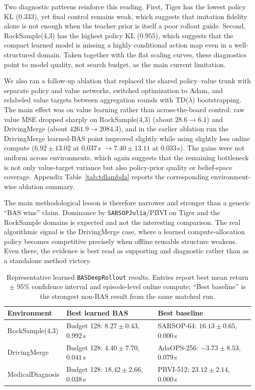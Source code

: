 \documentclass[10pt,twocolumn]{article}
\begin{document}
Two diagnostic patterns reinforce this reading. First, Tiger has the lowest policy KL ($0.333$), yet final control remains weak, which suggests that imitation fidelity alone is not enough when the teacher prior is itself a poor rollout guide. Second, RockSample(4,3) has the highest policy KL ($0.955$), which suggests that the compact learned model is missing a highly conditional action map even in a well-structured domain. Taken together with the flat scaling curves, these diagnostics point to model quality, not search budget, as the main current limitation.

We also ran a follow-up ablation that replaced the shared policy--value trunk with separate policy and value networks, switched optimization to Adam, and relabeled value targets between aggregation rounds with TD($\lambda$) bootstrapping. The main effect was on value learning rather than across-the-board control: raw value MSE dropped sharply on RockSample(4,3) (about $28.6 \rightarrow 6.1$) and DrivingMerge (about $4261.9 \rightarrow 2084.3$), and in the earlier ablation run the DrivingMerge learned-BAS point improved slightly while using slightly less online compute ($6.92\pm13.02$ at $0.037$\,s $\rightarrow 7.40\pm13.11$ at $0.033$\,s). The gains were not uniform across environments, which again suggests that the remaining bottleneck is not only value-target variance but also policy-prior quality or belief-space coverage. Appendix Table~\ref{tab:tdlambda} reports the corresponding environment-wise ablation summary.

The main methodological lesson is therefore narrower and stronger than a generic ``BAS wins'' claim. Dominance by \texttt{SARSOPJulia}/PBVI on Tiger and the RockSample domains is expected and not the interesting comparison. The real algorithmic signal is the DrivingMerge case, where a learned compute-allocation policy becomes competitive precisely when offline reusable structure weakens. Even there, the evidence is best read as supporting and diagnostic rather than as a standalone method victory.

\begin{table}[t]
\centering
\caption{Representative learned \texttt{BASDeepRollout} results. Entries report best mean return $\pm$ 95\% confidence interval and episode-level online compute; ``Best baseline'' is the strongest non-BAS result from the same matched run.}
\label{tab:basdr}
\scriptsize
\begin{tabular}{@{}p{} p{} p{}@{}}
\toprule
Environment & Best learned BAS & Best baseline \\
\midrule
RockSample\allowbreak(4,3) & Budget 128: $8.27\pm0.43$, $0.992$\,s & SARSOP-64: $16.13\pm0.65$, $0.000$\,s \\
DrivingMerge & Budget 128: $4.40\pm7.70$, $0.041$\,s & AdaOPS-256: $-3.73\pm8.53$, $0.079$\,s \\
Medical\allowbreak Diagnosis & Budget 128: $18.42\pm2.66$, $0.038$\,s & PBVI-512: $23.12\pm2.14$, $0.000$\,s \\
\bottomrule
\end{tabular}
\end{table}
\end{document}
